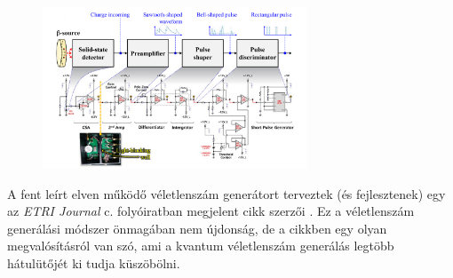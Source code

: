 \documentclass[12pt,a4paper,oneside]{article}
\begin{document}
\par
\begin{figure}[ht!]
	\centering
	\includegraphics[width=0.7\textwidth]{beta1.png}
\end{figure}
A fent leírt elven működő véletlenszám generátort terveztek (és fejlesztenek) egy az \textit{ETRI Journal} c. folyóiratban megjelent cikk szerzői \cite{beta}. Ez a véletlenszám generálási módszer önmagában nem újdonság, de a cikkben egy olyan megvalósításról van szó, ami a kvantum véletlenszám generálás legtöbb hátulütőjét ki tudja küszöbölni.
\end{document}
